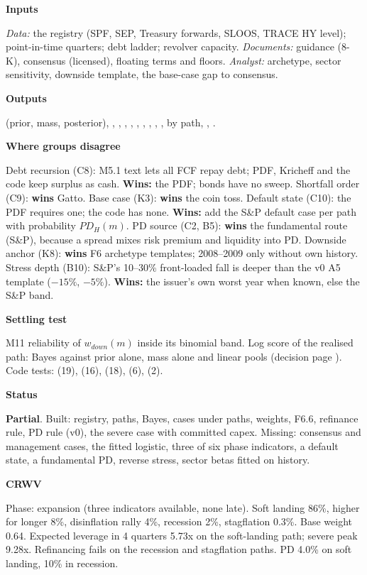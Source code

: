 \documentclass[11pt]{article}
\newcommand{\stpartial}{\textcolor{warn}{\textbf{Partial}}}
\newcommand{\fld}[1]{\par\medskip\noindent\textbf{\textcolor{steel}{#1}}\par\nopagebreak}
\begin{document}
\fld{Inputs} \emph{Data:} the registry (SPF, SEP, Treasury forwards, SLOOS, TRACE HY level); point-in-time quarters; debt ladder; revolver capacity. \emph{Documents:} guidance (8-K), consensus (licensed), floating terms and floors. \emph{Analyst:} archetype, sector sensitivity, downside template, the base-case gap to consensus.

\fld{Outputs}  (prior, mass, posterior), , , , , , , , , ,  by path, , .

\fld{Where groups disagree} Debt recursion (C8): M5.1 text lets all FCF repay debt; PDF, Kricheff and the code keep surplus as cash. \textbf{Wins:} the PDF; bonds have no sweep. Shortfall order (C9): \textbf{wins} Gatto. Base case (K3): \textbf{wins} the coin toss. Default state (C10): the PDF requires one; the code has none. \textbf{Wins:} add the S\&P default case per path with probability $PD_H(m)$. PD source (C2, B5): \textbf{wins} the fundamental route (S\&P), because a spread mixes risk premium and liquidity into PD. Downside anchor (K8): \textbf{wins} F6 archetype templates; 2008--2009 only without own history. Stress depth (B10): S\&P's 10--30\% front-loaded fall is deeper than the v0 A5 template ($-15\%$, $-5\%$). \textbf{Wins:} the issuer's own worst year when known, else the S\&P band.

\fld{Settling test} M11 reliability of $w_{down}(m)$ inside its binomial band. Log score of the realised path: Bayes against prior alone, mass alone and linear pools (decision page ). Code tests:  (19),  (16),  (18),  (6),  (2).

\fld{Status} \stpartial. Built: registry, paths, Bayes, cases under paths, weights, F6.6, refinance rule, PD rule (v0), the severe case with committed capex. Missing: consensus and management cases, the fitted logistic, three of six phase indicators, a default state, a fundamental PD, reverse stress, sector betas fitted on history.

\fld{CRWV} Phase: expansion (three indicators available, none late). Soft landing 86\%, higher for longer 8\%, disinflation rally 4\%, recession 2\%, stagflation 0.3\%. Base weight 0.64. Expected leverage in 4 quarters 5.73x on the soft-landing path; severe peak 9.28x. Refinancing fails on the recession and stagflation paths. PD 4.0\% on soft landing, 10\% in recession.
\end{document}
